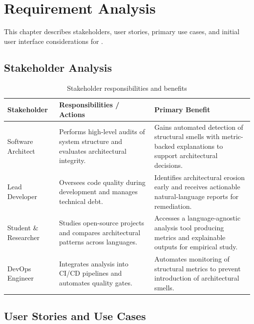 \chapter{Requirement Analysis}
\label{chap:requirement-analysis}

This chapter describes stakeholders, user stories, primary use cases, and initial user interface considerations for \usevar{\srsNickName}.

\section{Stakeholder Analysis}
\label{section:stakeholder-analysis}

\begin{table}[!htbp]
    \centering
    \small
    \setlength{\tabcolsep}{4pt}
    \renewcommand{\arraystretch}{1.05}
    \begin{tabularx}{\textwidth}{| p{3.0cm} | X | X |}
        \hline
        \textbf{Stakeholder} & \textbf{Responsibilities / Actions} & \textbf{Primary Benefit} \\
        \hline
        Software Architect
        & Performs high-level audits of system structure and evaluates architectural integrity.
        & Gains automated detection of structural smells with metric-backed explanations to support architectural decisions. \\
        \hline
        Lead Developer
        & Oversees code quality during development and manages technical debt.
        & Identifies architectural erosion early and receives actionable natural-language reports for remediation. \\
        \hline
        Student \& Researcher
        & Studies open-source projects and compares architectural patterns across languages.
        & Accesses a language-agnostic analysis tool producing metrics and explainable outputs for empirical study. \\
        \hline
        DevOps Engineer
        & Integrates analysis into CI/CD pipelines and automates quality gates.
        & Automates monitoring of structural metrics to prevent introduction of architectural smells. \\
        \hline
    \end{tabularx}
    \normalsize
    \caption{Stakeholder responsibilities and benefits}
    \label{tab:stakeholders}
\end{table}
\FloatBarrier

\section{User Stories and Use Cases}
\label{section:user-stories-use-cases}

